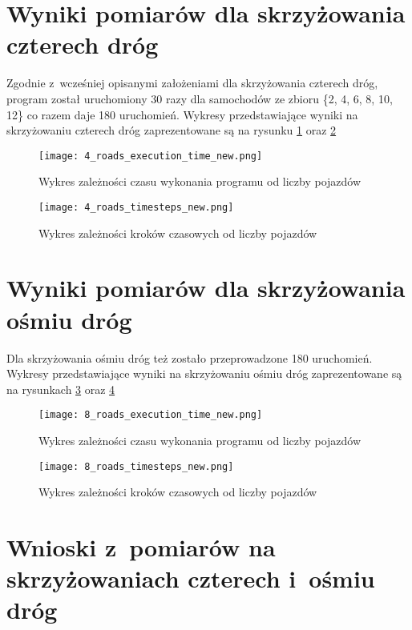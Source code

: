 \section{Wyniki pomiarów dla skrzyżowania czterech dróg}

Zgodnie z~wcześniej opisanymi założeniami dla skrzyżowania czterech dróg, program został uruchomiony 30 razy dla samochodów ze zbioru \{2, 4, 6, 8, 10, 12\} co razem daje 180 uruchomień.
\newline
\newline
Wykresy przedstawiające wyniki na skrzyżowaniu czterech dróg zaprezentowane są na rysunku \ref{4_roads_execution_time_new} oraz \ref{four-roads-crossroads-timesteps}
\begin{figure}[H]
  \centering
  \texttt{[image: 4\_roads\_execution\_time\_new.png]}
  \caption{Wykres zależności czasu wykonania programu od liczby pojazdów}
  \label{4_roads_execution_time_new}
\end{figure}
\begin{figure}[H]
  \centering
  \texttt{[image: 4\_roads\_timesteps\_new.png]}
  \caption{Wykres zależności kroków czasowych od liczby pojazdów}
  \label{four-roads-crossroads-timesteps}
\end{figure}

\section{Wyniki pomiarów dla skrzyżowania ośmiu dróg}

Dla skrzyżowania ośmiu dróg też zostało przeprowadzone 180 uruchomień. Wykresy przedstawiające wyniki na skrzyżowaniu ośmiu dróg zaprezentowane są na rysunkach \ref{8_roads_execution_time_new} oraz \ref{8_roads_timesteps_new}
\begin{figure}[H]
  \centering
  \texttt{[image: 8\_roads\_execution\_time\_new.png]}
  \caption{Wykres zależności czasu wykonania programu od liczby pojazdów}
  \label{8_roads_execution_time_new}
\end{figure}
\begin{figure}[H]
  \centering
  \texttt{[image: 8\_roads\_timesteps\_new.png]}
  \caption{Wykres zależności kroków czasowych od liczby pojazdów}
  \label{8_roads_timesteps_new}
\end{figure}

\section{Wnioski z~pomiarów na skrzyżowaniach czterech i~ośmiu dróg}

